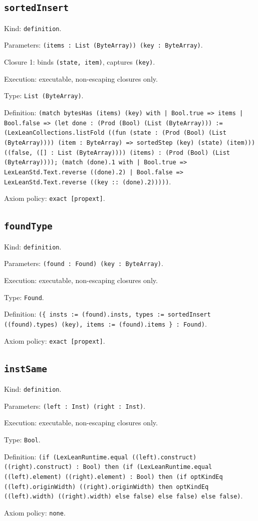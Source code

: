 \documentclass[11pt]{article}
\begin{document}
\subsection*{\texttt{sortedInsert}}
\noindent Kind: \texttt{definition}.\par
\noindent Parameters: \texttt{(items : List (ByteArray)) (key : ByteArray)}.\par
\noindent Closure 1: binds \texttt{(state, item)}, captures \texttt{(key)}.\par
\noindent Execution: executable, non-escaping closures only.\par
\noindent Type: \texttt{List (ByteArray)}.\par
\noindent Definition: \texttt{(match bytesHas (items) (key) with | Bool.true => items | Bool.false => (let done : (Prod (Bool) (List (ByteArray))) := (LexLeanCollections.listFold ((fun (state : (Prod (Bool) (List (ByteArray)))) (item : ByteArray) => sortedStep (key) (state) (item))) ((false, ([] : List (ByteArray)))) (items) : (Prod (Bool) (List (ByteArray)))); (match (done).1 with | Bool.true => LexLeanStd.Text.reverse ((done).2) | Bool.false => LexLeanStd.Text.reverse ((key :: (done).2)))))}.\par
\noindent Axiom policy: \texttt{exact [propext]}.\par
\subsection*{\texttt{foundType}}
\noindent Kind: \texttt{definition}.\par
\noindent Parameters: \texttt{(found : Found) (key : ByteArray)}.\par
\noindent Execution: executable, non-escaping closures only.\par
\noindent Type: \texttt{Found}.\par
\noindent Definition: \texttt{(\{ insts := (found).insts, types := sortedInsert ((found).types) (key), items := (found).items \} : Found)}.\par
\noindent Axiom policy: \texttt{exact [propext]}.\par
\subsection*{\texttt{instSame}}
\noindent Kind: \texttt{definition}.\par
\noindent Parameters: \texttt{(left : Inst) (right : Inst)}.\par
\noindent Execution: executable, non-escaping closures only.\par
\noindent Type: \texttt{Bool}.\par
\noindent Definition: \texttt{(if (LexLeanRuntime.equal ((left).construct) ((right).construct) : Bool) then (if (LexLeanRuntime.equal ((left).element) ((right).element) : Bool) then (if optKindEq ((left).originWidth) ((right).originWidth) then optKindEq ((left).width) ((right).width) else false) else false) else false)}.\par
\noindent Axiom policy: \texttt{none}.\par
\end{document}

